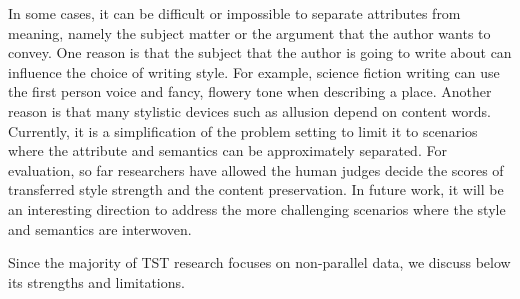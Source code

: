 In some cases, it can be difficult or impossible to separate attributes from meaning, namely the subject matter or the argument that the author wants to convey. One reason is that the subject that the author is going to write about can influence the choice of writing style. For example, science fiction writing can use the first person voice and fancy, flowery tone when describing a place. Another reason is that many stylistic devices such as allusion depend on content words. 
Currently, it is a simplification of the problem setting to limit it to scenarios where the attribute and semantics can be approximately separated. For evaluation, so far researchers have allowed the human judges decide the scores of transferred style strength and the content preservation.
In future work, it will be an interesting direction to address the more challenging scenarios where the style and semantics are interwoven.

\label{sec:improving_method}
Since the majority of TST research focuses on non-parallel data, we discuss below its strengths and limitations.

